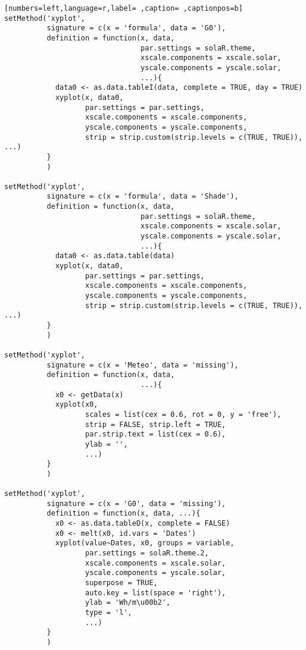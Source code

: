 \begin{lstlisting}[numbers=left,language=r,label= ,caption= ,captionpos=b]
setMethod('xyplot',
          signature = c(x = 'formula', data = 'G0'),
          definition = function(x, data,
                                par.settings = solaR.theme,
                                xscale.components = xscale.solar,
                                yscale.components = yscale.solar,
                                ...){
            data0 <- as.data.tableI(data, complete = TRUE, day = TRUE)
            xyplot(x, data0,
                   par.settings = par.settings,
                   xscale.components = xscale.components,
                   yscale.components = yscale.components,
                   strip = strip.custom(strip.levels = c(TRUE, TRUE)), ...)
          }
          )

setMethod('xyplot',
          signature = c(x = 'formula', data = 'Shade'),
          definition = function(x, data,
                                par.settings = solaR.theme,
                                xscale.components = xscale.solar,
                                yscale.components = yscale.solar,
                                ...){
            data0 <- as.data.table(data)
            xyplot(x, data0,
                   par.settings = par.settings,
                   xscale.components = xscale.components,
                   yscale.components = yscale.components,
                   strip = strip.custom(strip.levels = c(TRUE, TRUE)), ...)
          }
          )

setMethod('xyplot',
          signature = c(x = 'Meteo', data = 'missing'),
          definition = function(x, data,
                                ...){
            x0 <- getData(x)
            xyplot(x0,
                   scales = list(cex = 0.6, rot = 0, y = 'free'),
                   strip = FALSE, strip.left = TRUE,
                   par.strip.text = list(cex = 0.6),
                   ylab = '',
                   ...)
          }
          )

setMethod('xyplot',
          signature = c(x = 'G0', data = 'missing'),
          definition = function(x, data, ...){
            x0 <- as.data.tableD(x, complete = FALSE)              
            x0 <- melt(x0, id.vars = 'Dates')
            xyplot(value~Dates, x0, groups = variable,
                   par.settings = solaR.theme.2,
                   xscale.components = xscale.solar,
                   yscale.components = yscale.solar,
                   superpose = TRUE,
                   auto.key = list(space = 'right'),
                   ylab = 'Wh/m\u00b2',
                   type = 'l',
                   ...)     
          }
          )


\end{lstlisting}
